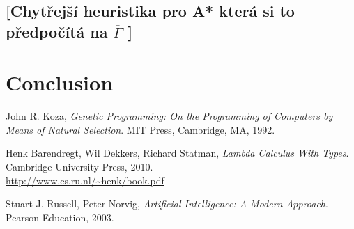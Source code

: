 \documentclass[12pt,a4paper]{report}
\begin{document}
\section{[Chytřejší heuristika pro A* která si to předpočítá na $\overline{\Gamma}$ ]}





\chapter*{Conclusion}
	

\begin{thebibliography}{9}



  John R. Koza,
  \emph{Genetic Programming: On the Programming of Computers by Means of Natural Selection}.
  MIT Press, Cambridge, MA,
  1992. 


  Henk Barendregt, Wil Dekkers, Richard Statman,
  \emph{Lambda Calculus With Types}.
  Cambridge University Press,
  2010. \\
  \url{http://www.cs.ru.nl/~henk/book.pdf}



	Stuart J. Russell, Peter Norvig,
	\emph{Artificial Intelligence: A Modern Approach}.
	Pearson Education,
	2003. 

\end{thebibliography}

	
	
\end{document}
